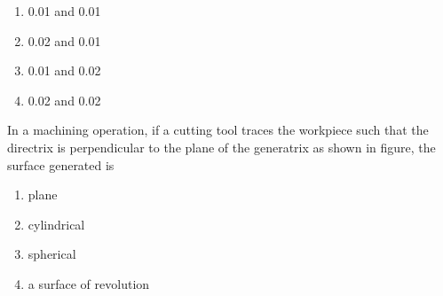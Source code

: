         \begin{multicols}{4}
            \begin{enumerate}
                \item 0.01 and 0.01
                    \columnbreak
                \item 0.02 and 0.01
                    \columnbreak
                \item 0.01 and 0.02
                    \columnbreak
                \item 0.02 and 0.02
            \end{enumerate}
        \end{multicols}

    \item In a machining operation, if a cutting tool traces the workpiece such that the directrix is
        perpendicular to the plane of the generatrix as shown in figure, the surface generated is 
        \begin{center}
        \end{center}
        \hfill{}
        \begin{multicols}{4}
            \begin{enumerate}
                \item plane
                    \columnbreak
                \item cylindrical
                    \columnbreak
                \item spherical
                    \columnbreak
                \item a surface of revolution
            \end{enumerate}
        \end{multicols}


